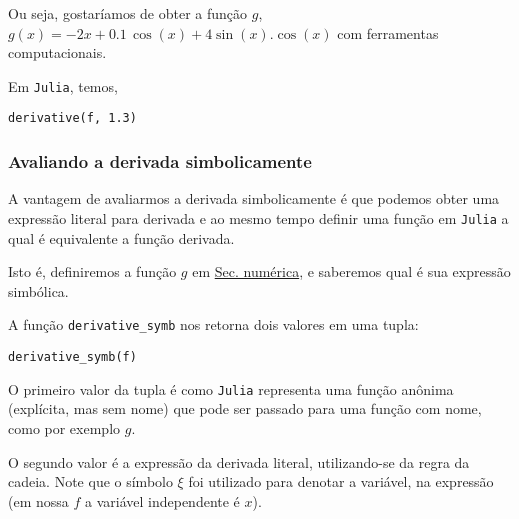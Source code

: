 \documentclass[12pt]{article}
\begin{document}
Ou seja, gostaríamos de obter a função \(g\), \(g(x) =-2x +  0.1 \,
\cos(x) + 4\sin(x).\cos(x)\) com ferramentas computacionais.

Em \texttt{Julia}, temos,

\begin{verbatim}
derivative(f, 1.3)
\end{verbatim}

\subsubsection{Avaliando a derivada \textbf{simbolicamente}}
\label{sec:orgfe07427}
A vantagem de avaliarmos a derivada simbolicamente é que podemos obter
uma expressão literal para derivada e ao mesmo tempo definir uma
função em \texttt{Julia} a qual é equivalente a função derivada.

Isto é, definiremos a função \(g\) em \hyperref[sec:orgd43ace4]{Sec. numérica}, e saberemos qual é sua expressão simbólica.

A função \texttt{derivative\_symb} nos retorna dois valores em uma tupla:

\begin{verbatim}
derivative_symb(f)
\end{verbatim}

O primeiro valor da tupla é como \texttt{Julia} representa uma função anônima
(explícita, mas sem nome) que pode ser passado para uma função com
nome, como por exemplo \(g\).

O segundo valor é a expressão da derivada literal, utilizando-se da
regra da cadeia. Note que o símbolo \(\xi\) foi utilizado para denotar a
variável, na expressão (em nossa \(f\) a variável independente é \(x\)).
\end{document}
